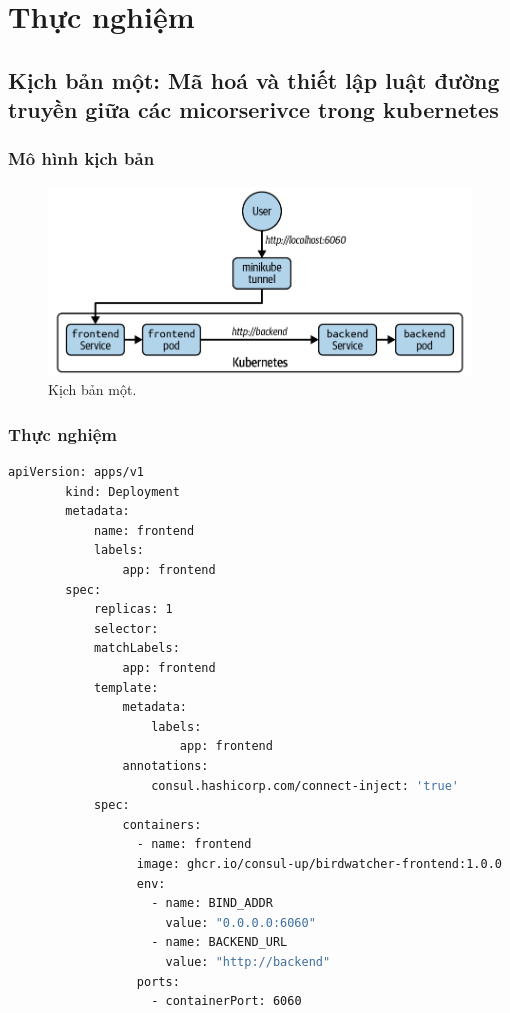 \documentclass[12pt,a4paper]{report}
\begin{document}
	\section{Thực nghiệm}
	\subsection{Kịch bản một: Mã hoá và thiết lập luật đường truyền giữa các micorserivce trong kubernetes}
	\subsubsection{Mô hình kịch bản}
	 \begin{figure}[h]
		\centering
		\includegraphics[width=0.7\linewidth]{Pics/kb1}
		\caption{\label{fig:kb1} Kịch bản một.}
		\label{fig:kb1}
	\end{figure}
	
	\hspace{1.0cm}{Ở trong kịch bản này, mục tiêu của chúng ta là sẽ tiến hành mã hoá và thiết lập các luật cho microservice. Các cách mã hoá sẽ được giải thích ở phần bên dưới.}
	\subsubsection{Thực nghiệm}
	\hspace{1.0cm}{Đầu tiên, chúng ta có tạo một tệp tin cấu hình của ứng dụng và service dành cho frontend, nội dung của tệp tin đó như sau:}
	\begin{lstlisting}[language=Bash]
		apiVersion: apps/v1
		kind: Deployment
		metadata:
			name: frontend
			labels:
				app: frontend
		spec:
			replicas: 1
			selector:
			matchLabels:
				app: frontend
			template:
				metadata:
					labels:
						app: frontend
				annotations:
					consul.hashicorp.com/connect-inject: 'true'
			spec:
				containers:
				  - name: frontend
				  image: ghcr.io/consul-up/birdwatcher-frontend:1.0.0
				  env:
					- name: BIND_ADDR
					  value: "0.0.0.0:6060"
					- name: BACKEND_URL
					  value: "http://backend"
				  ports:
				    - containerPort: 6060
	\end{lstlisting}
\end{document}
